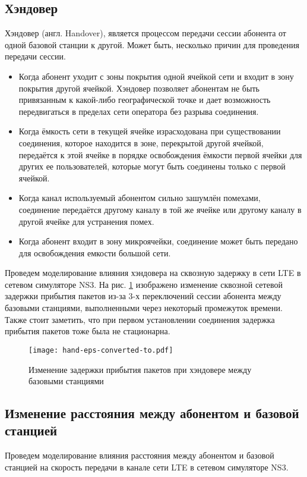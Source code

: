 \subsection{Хэндовер}  \label{handover_chapter2}
Хэндовер (англ. Handover), является процессом передачи сессии абонента от одной базовой станции к другой. Может быть, несколько причин для проведения передачи сессии.
\begin{itemize}
\item Когда абонент уходит с зоны покрытия одной ячейкой сети и входит в зону покрытия другой ячейкой. Хэндовер позволяет абонентам не быть привязанным к какой-либо географической точке и дает возможность передвигаться в пределах сети оператора без разрыва соединения.
\item Когда ёмкость сети в текущей ячейке израсходована при существовании соединения, которое находится в зоне, перекрытой другой ячейкой, передаётся к этой ячейке в порядке освобождения ёмкости первой ячейки для других ее пользователей, которые могут быть соединены только с первой ячейкой.
\item Когда канал используемый абонентом сильно зашумлён помехами, соединение передаётся другому каналу в той же ячейке или другому каналу в другой ячейке для устранения помех.
\item Когда абонент входит в зону микроячейки, соединение может быть передано для освобождения емкости большой сети.
\end{itemize}
Проведем моделирование влияния хэндовера на сквозную задержку в сети LTE в сетевом симуляторе NS3.
На рис. \ref{img:hand} изображено изменение сквозной сетевой задержки прибытия пакетов из-за 3-х переключений сессии абонента между базовыми станциями, выполненными через некоторый промежуток времени.
Также стоит заметить, что при первом установлении соединения задержка прибытия пакетов тоже была не стационарна.
\begin{figure} [h]
  \center
\texttt{[image: hand-eps-converted-to.pdf]}
  \caption{Изменение задержки прибытия пакетов при хэндовере между базовыми станциями}
  \label{img:hand}
\end{figure}

\subsection{Изменение расстояния между абонентом и базовой станцией}  \label{sect2_2_2}
Проведем моделирование влияния расстояния между абонентом и базовой станцией на скорость передачи в канале сети LTE в сетевом симуляторе NS3.



